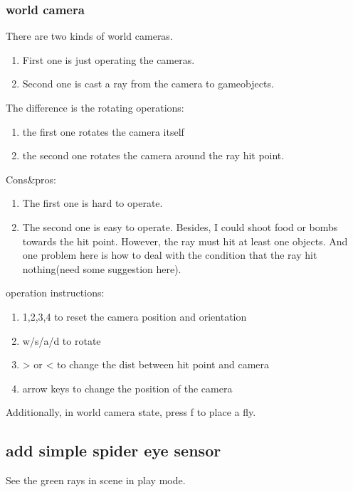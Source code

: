 \documentclass[11pt]{article}
\begin{document}
\subsubsection{world camera}
\label{sec-1-1-3}
There are two kinds of world cameras.
\begin{enumerate}
\item First one is just operating the cameras.
\item Second one is cast a ray from the camera to gameobjects.
\end{enumerate}
The difference is the rotating operations:
\begin{enumerate}
\item the first one rotates the camera itself
\item the second one rotates the camera around the ray hit point.
\end{enumerate}
Cons\&pros:
\begin{enumerate}
\item The first one is hard to operate.
\item The second one is easy to operate. Besides, I could shoot food or bombs towards the hit point. However, the ray must hit at least one objects. And one problem here is how to deal with the condition that the ray hit nothing(need some suggestion here).
\end{enumerate}
operation instructions:
\begin{enumerate}
\item 1,2,3,4 to reset the camera position and orientation
\item w/s/a/d to rotate
\item > or < to change the dist between hit point and camera
\item arrow keys to change the position of the camera
\end{enumerate}

Additionally, in world camera state, press f to place a fly.

\subsection{add simple spider eye sensor}
\label{sec-1-2}
See the green rays in scene in play mode.
\end{document}
